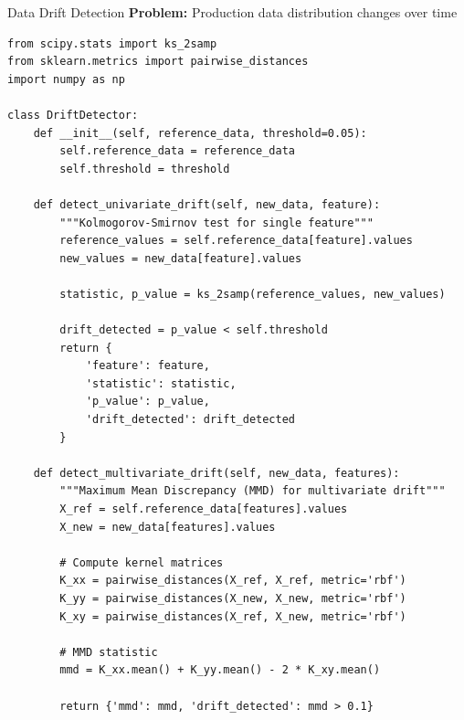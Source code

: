 \begin{frame}[fragile]{Data Drift Detection}
\textbf{Problem:} Production data distribution changes over time

\vspace{0.2cm}
\begin{lstlisting}[basicstyle=\ttfamily\tiny]
from scipy.stats import ks_2samp
from sklearn.metrics import pairwise_distances
import numpy as np

class DriftDetector:
    def __init__(self, reference_data, threshold=0.05):
        self.reference_data = reference_data
        self.threshold = threshold

    def detect_univariate_drift(self, new_data, feature):
        """Kolmogorov-Smirnov test for single feature"""
        reference_values = self.reference_data[feature].values
        new_values = new_data[feature].values

        statistic, p_value = ks_2samp(reference_values, new_values)

        drift_detected = p_value < self.threshold
        return {
            'feature': feature,
            'statistic': statistic,
            'p_value': p_value,
            'drift_detected': drift_detected
        }

    def detect_multivariate_drift(self, new_data, features):
        """Maximum Mean Discrepancy (MMD) for multivariate drift"""
        X_ref = self.reference_data[features].values
        X_new = new_data[features].values

        # Compute kernel matrices
        K_xx = pairwise_distances(X_ref, X_ref, metric='rbf')
        K_yy = pairwise_distances(X_new, X_new, metric='rbf')
        K_xy = pairwise_distances(X_ref, X_new, metric='rbf')

        # MMD statistic
        mmd = K_xx.mean() + K_yy.mean() - 2 * K_xy.mean()

        return {'mmd': mmd, 'drift_detected': mmd > 0.1}
\end{lstlisting}
\end{frame}

